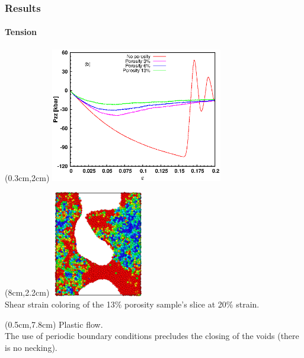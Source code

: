 \begin{frame}
    \frametitle{Results}
    \framesubtitle{Tension}
    \begin{textblock*}{7.5cm}(0.3cm,2cm) %
        \includegraphics[width=7.5cm]{Presentacion_PANACM_Franco/Pzz_strain_tens.eps}
    \end{textblock*}
    \begin{textblock*}{4cm}(8cm,2.2cm) %
        \includegraphics[width=4cm]{Presentacion_PANACM_Franco/13_20strain_tens.png}\\
        \centering
        \tiny{Shear strain coloring of the 13\% porosity sample’s slice at 20\% strain.}
    \end{textblock*}
    \begin{textblock*}{11.5cm}(0.5cm,7.8cm) %
        Plastic flow.\\
        The use of periodic boundary conditions precludes the closing of the voids (there is no necking).
    \end{textblock*}
\end{frame}

